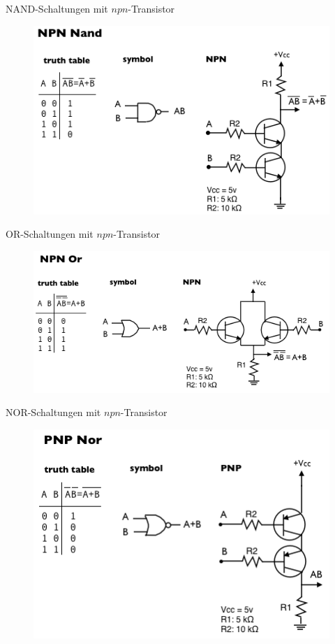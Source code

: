 \documentclass[12pt%
,aspectratio=169%
]{beamer}
\begin{document}
\begin{frame}{NAND-Schaltungen mit $npn$-Transistor}
\begin{figure}
\center
\includegraphics[scale=0.65]{pictures/nand}
\end{figure}
\end{frame}


\begin{frame}{OR-Schaltungen mit $npn$-Transistor}
\begin{figure}
\center
\includegraphics[scale=0.6]{pictures/or}
\end{figure}
\end{frame}

\begin{frame}{NOR-Schaltungen mit $npn$-Transistor}
\begin{figure}
\center
\includegraphics[scale=0.65]{pictures/nor}
\end{figure}
\end{frame}
\end{document}
